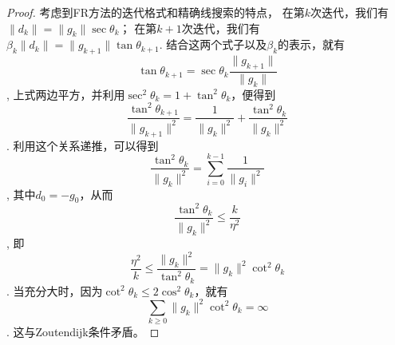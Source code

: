 \begin{proof}
            考虑到FR方法的迭代格式和精确线搜索的特点，
            在第$k$次迭代，我们有$\|d_k\|=\|g_k\|\sec\theta_k $；
            在第$k+1$次迭代，我们有$\beta_k\|d_k\| = \|g_{k+1}\|\tan\theta_{k+1}$.
            结合这两个式子以及$\beta_k$的表示，就有
            \begin{equation}
                \tan\theta_{k+1}=\sec\theta_k\displaystyle\frac{\|g_{k+1}\|}{\|g_k\|}
                \nonumber
        	\end{equation},
        	上式两边平方，并利用$\sec^2\theta_k=1+\tan^2\theta_k$，便得到
            \begin{equation}
                \displaystyle\frac{\tan^2\theta_{k+1}}{\|g_{k+1}\|^2} = 
                \displaystyle\frac{1}{\|g_k\|^2} + 
                \displaystyle\frac{\tan^2\theta_k}{\|g_k\|^2}
                \nonumber
        	\end{equation}.
        	利用这个关系递推，可以得到
            \begin{equation}
                \displaystyle\frac{\tan^2\theta_k}{\|g_k\|^2} = 
                \displaystyle\sum_{i=0}^{k-1}\frac{1}{\|g_i\|^2} 
                \nonumber
        	\end{equation},
        	其中$d_0=-g_0$，从而
            \begin{equation}
                \displaystyle\frac{\tan^2\theta_k}{\|g_k\|^2} \leq
                \displaystyle\frac{k}{\eta^2}
                \nonumber
        	\end{equation},
        	即
            \begin{equation}
                \displaystyle\frac{\eta^2}{k} \leq
                \displaystyle\frac{\|g_k\|^2}{\tan^2\theta_k} =
                \|g_k\|^2\cot^2\theta_k
                \nonumber
        	\end{equation}.
        	当充分大时，因为$\cot^2\theta_k\leq2\cos^2\theta_k$，就有
            \begin{equation}
                \displaystyle\sum_{k\geq0}\|g_k\|^2\cot^2\theta_k = \infty
                \nonumber
        	\end{equation}.
        	这与Zoutendijk条件矛盾。
        \end{proof}